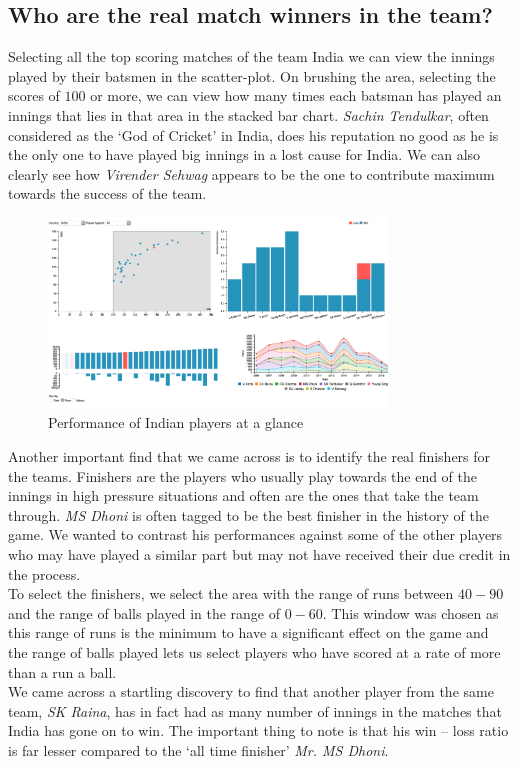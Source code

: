 \documentclass[10pt,journal,compsoc]{IEEEtran}
\begin{document}
\subsection{Who are the real match winners in the team?}
Selecting all the top scoring matches of the team India we can view the innings played by their batsmen in the scatter-plot. On brushing the area, selecting the scores of $100$ or more, we can view how many times each batsman has played an innings that lies in that area in the stacked bar chart. \textit{Sachin Tendulkar}, often considered as the `God of Cricket' in India, does his reputation no good as he is the only one to have played big innings in a lost cause for India. We can also clearly see how \textit{Virender Sehwag} appears to be the one to contribute maximum towards the success of the team.
\begin{figure}[ht]
\includegraphics[width=9cm]{case4.png}
\caption{Performance of Indian players at a glance}
\label{fig:case4}
\end{figure}
Another important find that we came across is to identify the real finishers for the teams. Finishers are the players who usually play towards the end of the innings in high pressure situations and often are the ones that take the team through. \textit{MS Dhoni} is often tagged to be the best finisher in the history of the game. We wanted to contrast his performances against some of the other players who may have played a similar part but may not have received their due credit in the process. \\
\indent To select the finishers, we select the area with the range of runs between $40 - 90$ and the range of balls played in the range of $0 - 60$. This window was chosen as this range of runs is the minimum to have a significant effect on the game and the range of balls played lets us select players who have scored at a rate of more than a run a ball. \\
\indent We came across a startling discovery to find that another player from the same team, \textit{SK Raina}, has in fact had as many number of innings in the matches that India has gone on to win. The important thing to note is that his win – loss ratio is far lesser compared to the `all time finisher' \textit{Mr. MS Dhoni}.
\end{document}

